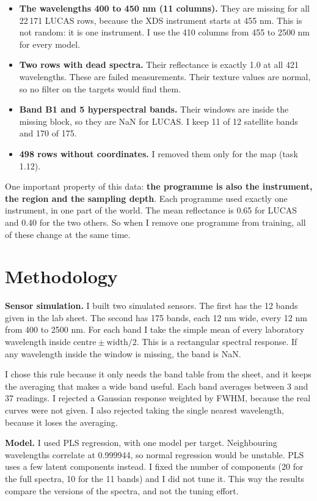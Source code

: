 \documentclass[10pt,a4paper]{article}
\begin{document}
\begin{itemize}
\item \textbf{The wavelengths 400 to 450 nm (11 columns).} They are missing for all 22\,171
      LUCAS rows, because the XDS instrument starts at 455 nm. This is not random: it is one
      instrument. I use the 410 columns from 455 to 2500 nm for every model.
\item \textbf{Two rows with dead spectra.} Their reflectance is exactly 1.0 at all 421
      wavelengths. These are failed measurements. Their texture values are normal, so no
      filter on the targets would find them.
\item \textbf{Band B1 and 5 hyperspectral bands.} Their windows are inside the missing block,
      so they are NaN for LUCAS. I keep 11 of 12 satellite bands and 170 of 175.
\item \textbf{498 rows without coordinates.} I removed them only for the map (task 1.12).
\end{itemize}

One important property of this data: \textbf{the programme is also the instrument, the region
and the sampling depth}. Each programme used exactly one instrument, in one part of the
world. The mean reflectance is 0.65 for LUCAS and 0.40 for the two others. So when I remove
one programme from training, all of these change at the same time.

\section{Methodology}

\textbf{Sensor simulation.} I built two simulated sensors. The first has the 12 bands given
in the lab sheet. The second has 175 bands, each 12 nm wide, every 12 nm from 400 to 2500 nm.
For each band I take the simple mean of every laboratory wavelength inside
$\mathrm{centre} \pm \mathrm{width}/2$. This is a rectangular spectral response. If any
wavelength inside the window is missing, the band is NaN.

I chose this rule because it only needs the band table from the sheet, and it keeps the
averaging that makes a wide band useful. Each band averages between 3 and 37 readings. I
rejected a Gaussian response weighted by FWHM, because the real curves were not given. I also
rejected taking the single nearest wavelength, because it loses the averaging.

\textbf{Model.} I used PLS regression, with one model per target. Neighbouring wavelengths
correlate at 0.999944, so normal regression would be unstable. PLS uses a few latent
components instead. I fixed the number of components (20 for the full spectra, 10 for the 11
bands) and I did not tune it. This way the results compare the versions of the spectra, and
not the tuning effort.
\end{document}
